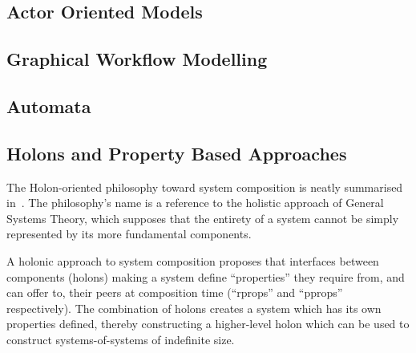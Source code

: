 \subsection{Actor Oriented Models}



\subsection{Graphical Workflow Modelling}



\subsection{Automata}


\subsection{Holons and Property Based Approaches}
The Holon-oriented philosophy toward system composition is neatly summarised
in~\cite{blair2015holons}. The philosophy's name is a reference to the holistic
approach of General Systems Theory, which supposes that the entirety of a system
cannot be simply represented by its more fundamental components.
\par

A holonic approach to system composition proposes that interfaces between
components (holons) making a system define ``properties'' they require from, and
can offer to, their peers at composition time (``rprops'' and ``pprops''
respectively). The combination of holons creates a system which has its own
properties defined, thereby constructing a higher-level holon which can be used
to construct systems-of-systems of indefinite size.
\par


